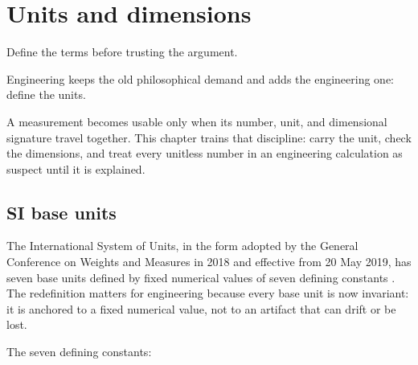 \chapter{Units and dimensions}
\label{vol01:ch02}

\epigraph{Define the terms before trusting the argument.}{Engineering
keeps the old philosophical demand and adds the engineering one:
define the units.}


\noindent
A measurement becomes usable only when its number, unit, and
dimensional signature travel together. This chapter trains that
discipline: carry the unit, check the dimensions, and treat every
unitless number in an engineering calculation as suspect until it is
explained.

\section{SI base units}

The International System of Units, in the form adopted by the General
Conference on Weights and Measures in 2018 and effective from 20 May
2019, has seven base units defined by fixed numerical values of seven
defining constants \cite{std:bipm-si2019}. The redefinition matters
for engineering because every base unit is now invariant: it is
anchored to a fixed numerical value, not to an artifact that can drift
or be lost.

The seven defining constants:

